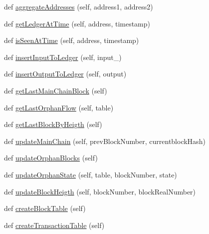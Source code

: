 \begin{DoxyCompactItemize}
def \hyperlink{classpostgreDb_1_1DatabaseWrapper_1_1DatabaseWrapper_ac509c3afc2bbc8e4e73be670dbc712ee}{aggregate\+Addresses} (self, address1, address2)
\item 
def \hyperlink{classpostgreDb_1_1DatabaseWrapper_1_1DatabaseWrapper_a1d011748df485278d4e48996737259ac}{get\+Ledger\+At\+Time} (self, address, timestamp)
\item 
def \hyperlink{classpostgreDb_1_1DatabaseWrapper_1_1DatabaseWrapper_a9a23bdd7248259238f94d717d331c109}{is\+Seen\+At\+Time} (self, address, timestamp)
\item 
def \hyperlink{classpostgreDb_1_1DatabaseWrapper_1_1DatabaseWrapper_a20c466599e2c2c64de102b47339f36fa}{insert\+Input\+To\+Ledger} (self, input\+\_\+)
\item 
def \hyperlink{classpostgreDb_1_1DatabaseWrapper_1_1DatabaseWrapper_a17a0a01a44a9e50919cbbe87dac62e3b}{insert\+Output\+To\+Ledger} (self, output)
\item 
def \hyperlink{classpostgreDb_1_1DatabaseWrapper_1_1DatabaseWrapper_af4ada9308310290c48d937347c740078}{get\+Last\+Main\+Chain\+Block} (self)
\item 
def \hyperlink{classpostgreDb_1_1DatabaseWrapper_1_1DatabaseWrapper_ab8bb7a22483d61791c1088cf95212852}{get\+Last\+Orphan\+Flow} (self, table)
\item 
def \hyperlink{classpostgreDb_1_1DatabaseWrapper_1_1DatabaseWrapper_a46fd2036e7900fadffc5fa9a8eb8ba56}{get\+Last\+Block\+By\+Heigth} (self)
\item 
def \hyperlink{classpostgreDb_1_1DatabaseWrapper_1_1DatabaseWrapper_afd91d516eb822d58e277eb3e99bedbd7}{update\+Main\+Chain} (self, prev\+Block\+Number, currentblock\+Hash)
\item 
def \hyperlink{classpostgreDb_1_1DatabaseWrapper_1_1DatabaseWrapper_a7b482b7387304bc6a3c741c39c8a79b8}{update\+Orphan\+Blocks} (self)
\item 
def \hyperlink{classpostgreDb_1_1DatabaseWrapper_1_1DatabaseWrapper_a4cc6f52854630e34a5f39191b82fef51}{update\+Orphan\+State} (self, table, block\+Number, state)
\item 
def \hyperlink{classpostgreDb_1_1DatabaseWrapper_1_1DatabaseWrapper_ac32d2cfa6e756e37bcab26f1f9e9218a}{update\+Block\+Heigth} (self, block\+Number, block\+Real\+Number)
\item 
def \hyperlink{classpostgreDb_1_1DatabaseWrapper_1_1DatabaseWrapper_a745fca421fa40b483cb705aa446fa009}{create\+Block\+Table} (self)
\item 
def \hyperlink{classpostgreDb_1_1DatabaseWrapper_1_1DatabaseWrapper_a7e0acef19b2130251a6fa27dee2f9b51}{create\+Transaction\+Table} (self)

\end{DoxyCompactItemize}
